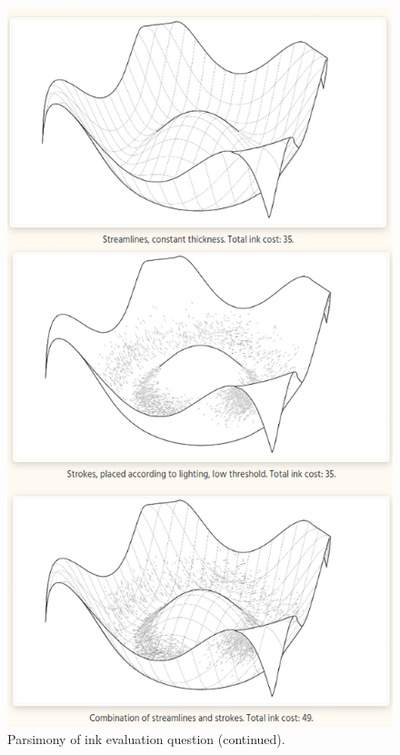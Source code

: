 \begin{figure}[h!]
	\centering
	\includegraphics[height=0.8\textheight]{images/eval_ink_2.png}
	\caption{Parsimony of ink evaluation question (continued).}\label{eval_ink_2}
\end{figure}


